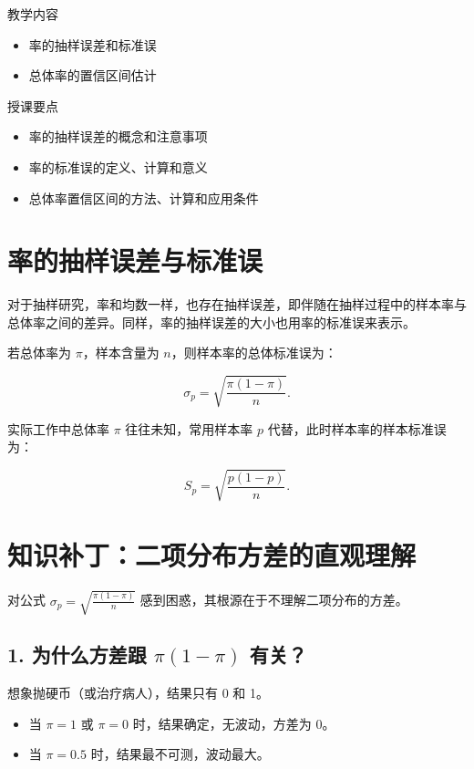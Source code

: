 \documentclass[lang=cn,10pt]{elegantbook}
\begin{document}
\begin{introduction}
    \item 教学内容
    \begin{itemize}
        \item 率的抽样误差和标准误
        \item 总体率的置信区间估计
    \end{itemize}
    \item 授课要点
    \begin{itemize}
        \item 率的抽样误差的概念和注意事项
        \item 率的标准误的定义、计算和意义
        \item 总体率置信区间的方法、计算和应用条件

    \end{itemize}
\end{introduction}

\section{率的抽样误差与标准误}

对于抽样研究，率和均数一样，也存在抽样误差，即伴随在抽样过程中的样本率与总体率之间的差异。同样，率的抽样误差的大小也用率的标准误来表示。

若总体率为 $\pi$，样本含量为 $n$，则样本率的总体标准误为：

\begin{equation}
  \sigma_p=\sqrt{\frac{\pi(1-\pi)}{n}}.
\end{equation}

实际工作中总体率 $\pi$ 往往未知，常用样本率 $p$ 代替，此时样本率的样本标准误为：

\begin{equation}
  S_p=\sqrt{\frac{p(1-p)}{n}}.
\end{equation}

\section{知识补丁：二项分布方差的直观理解}

对公式 $\sigma_p = \sqrt{\frac{\pi(1-\pi)}{n}}$ 感到困惑，其根源在于不理解二项分布的方差。

\subsection{1. 为什么方差跟 $\pi(1-\pi)$ 有关？}
想象抛硬币（或治疗病人），结果只有 0 和 1。
\begin{itemize}
    \item 当 $\pi=1$ 或 $\pi=0$ 时，结果确定，无波动，方差为 0。
    \item 当 $\pi=0.5$ 时，结果最不可测，波动最大。
\end{itemize}
\end{document}
